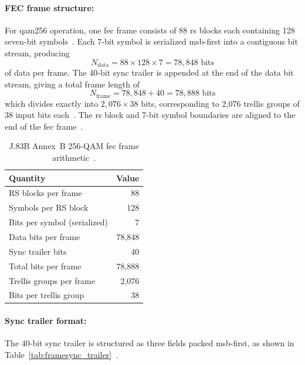 \paragraph{FEC frame structure:}
For \ac{qam256} operation, one \ac{fec} frame consists of 88
\ac{rs} blocks each containing 128 seven-bit symbols~\cite{ITU_J83}.
Each 7-bit symbol is serialized \ac{msb}-first into a contiguous
bit stream, producing~\cite{ITU_J83}
\begin{equation}
  N_\text{data} = 88 \times 128 \times 7 = 78{,}848 \text{ bits}
  \label{eq:fec_data_bits}
\end{equation}
\noindent of data per frame.
The 40-bit sync trailer is appended at the end of the data bit
stream, giving a total frame length of~\cite{ITU_J83}
\begin{equation}
  N_\text{frame} = 78{,}848 + 40 = 78{,}888 \text{ bits}
  \label{eq:fec_frame_bits}
\end{equation}
\noindent which divides exactly into $2{,}076 \times 38$ bits,
corresponding to 2{,}076 trellis groups of 38 input bits
each~\cite{ITU_J83}.
The \ac{rs} block and 7-bit symbol boundaries are aligned to the
end of the \ac{fec} frame~\cite{ITU_J83}.

\begin{table}[htbp]
  \caption{J.83B Annex~B 256-QAM \ac{fec} frame
           arithmetic~\cite{ITU_J83}.}
  \label{tab:fec_frame_arith}
  \centering
  \begin{tabular}{lr}
    \hline
    Quantity & Value \\
    \hline
    RS blocks per frame           & 88 \\
    Symbols per RS block          & 128 \\
    Bits per symbol (serialized)  & 7 \\
    Data bits per frame           & 78{,}848 \\
    Sync trailer bits             & 40 \\
    Total bits per frame          & 78{,}888 \\
    Trellis groups per frame      & 2{,}076 \\
    Bits per trellis group        & 38 \\
    \hline
  \end{tabular}
\end{table}

\paragraph{Sync trailer format:}
The 40-bit sync trailer is structured as three fields packed
\ac{msb}-first, as shown in
Table~\ref{tab:framesync_trailer}~\cite{ITU_J83}.

